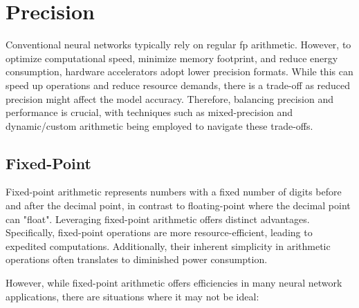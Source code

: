 \section{Precision}

Conventional neural networks typically rely on regular \gls{fp} arithmetic. However, to optimize computational speed, minimize memory footprint, and reduce energy consumption, hardware accelerators adopt lower precision formats. While this can speed up operations and reduce resource demands, there is a trade-off as reduced precision might affect the model accuracy. Therefore, balancing precision and performance is crucial, with techniques such as mixed-precision and dynamic/custom arithmetic being employed to navigate these trade-offs.
\subsection{Fixed-Point}

Fixed-point arithmetic represents numbers with a fixed number of digits before and after the decimal point, in contrast to floating-point where the decimal point can "float". Leveraging fixed-point arithmetic offers distinct advantages. Specifically, fixed-point operations are more resource-efficient, leading to expedited computations. Additionally, their inherent simplicity in arithmetic operations often translates to diminished power consumption. 


However, while fixed-point arithmetic offers efficiencies in many neural network applications, there are situations where it may not be ideal:

